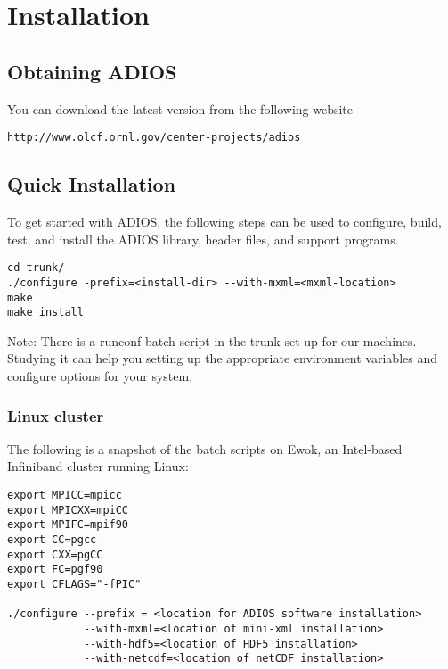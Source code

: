\chapter{Installation}

\section{Obtaining ADIOS}

You can download the latest version from the following website 

\begin{lstlisting}[language={}]
http://www.olcf.ornl.gov/center-projects/adios
\end{lstlisting}


\section{Quick Installation}

To get started with ADIOS, the following steps can be used to configure, build, 
test, and install the ADIOS library, header files, and support programs. 

\begin{lstlisting}
cd trunk/
./configure -prefix=<install-dir> --with-mxml=<mxml-location>
make
make install
\end{lstlisting}

Note: There is a runconf batch script in the trunk set up for our machines. Studying 
it can help you setting up the appropriate environment variables and configure 
options for your system.

\subsection{Linux cluster}

The following is a snapshot of the batch scripts on Ewok, an Intel-based Infiniband 
cluster running Linux:

\begin{lstlisting}
export MPICC=mpicc
export MPICXX=mpiCC
export MPIFC=mpif90
export CC=pgcc
export CXX=pgCC
export FC=pgf90
export CFLAGS="-fPIC"

./configure --prefix = <location for ADIOS software installation>
            --with-mxml=<location of mini-xml installation>
            --with-hdf5=<location of HDF5 installation>
            --with-netcdf=<location of netCDF installation>
\end{lstlisting}


